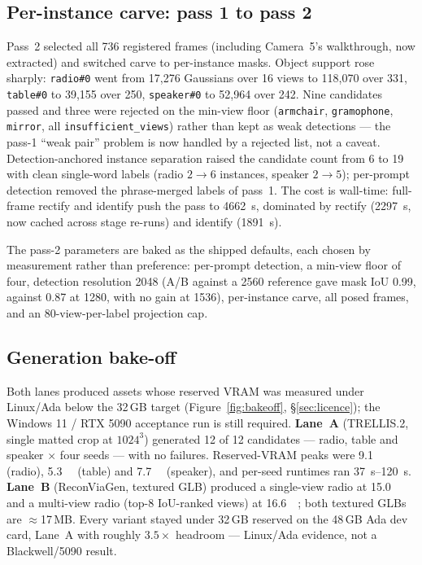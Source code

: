 \subsection{Per-instance carve: pass 1 to pass 2}
Pass~2 selected all 736 registered frames (including Camera~5's walkthrough, now extracted) and
switched carve to per-instance masks. Object support rose sharply: \texttt{radio\#0} went from
17{,}276 Gaussians over 16 views to 118{,}070 over 331, \texttt{table\#0} to 39{,}155 over 250,
\texttt{speaker\#0} to 52{,}964 over 242. Nine candidates passed and three were rejected on the
min-view floor (\texttt{armchair}, \texttt{gramophone}, \texttt{mirror}, all
\texttt{insufficient\_views}) rather than kept as weak detections --- the pass-1 ``weak pair''
problem is now handled by a rejected list, not a caveat. Detection-anchored instance separation
raised the candidate count from 6 to 19 with clean single-word labels (radio $2\to6$ instances,
speaker $2\to5$); per-prompt detection removed the phrase-merged labels of pass~1.
The cost is wall-time: full-frame rectify
and identify push the pass to \SI{4662}{\second}, dominated by rectify (\SI{2297}{\second}, now
cached across stage re-runs) and identify (\SI{1891}{\second}).

The pass-2 parameters are baked as the shipped defaults, each chosen by measurement rather than
preference: per-prompt detection, a min-view floor of four, detection resolution 2048 (A/B against
a 2560 reference gave mask IoU 0.99, against 0.87 at 1280, with no gain at 1536), per-instance
carve, all posed frames, and an 80-view-per-label projection cap.

\subsection{Generation bake-off}\label{sec:objgen}
Both lanes produced assets whose reserved VRAM was measured under Linux/Ada below the 32\,GB target
(Figure~\ref{fig:bakeoff}, \S\ref{sec:licence}); the Windows 11 / RTX 5090 acceptance run is still required.
\textbf{Lane~A} (TRELLIS.2, single matted crop at $1024^3$) generated 12 of 12 candidates ---
radio, table and speaker $\times$ four seeds --- with no failures. Reserved-VRAM peaks were
\SI{9.1}{\giga\byte} (radio), \SI{5.3}{\giga\byte} (table) and \SI{7.7}{\giga\byte} (speaker),
and per-seed runtimes ran \SIrange{37}{120}{\second}. \textbf{Lane~B} (ReconViaGen, textured GLB)
produced a single-view radio at \SI{15.0}{\giga\byte} and a multi-view radio (top-8 IoU-ranked
views) at \SI{16.6}{\giga\byte}; both textured GLBs are $\approx$17\,MB. Every variant stayed under 32\,GB reserved on the 48\,GB Ada
dev card, Lane~A with roughly $3.5\times$ headroom --- Linux/Ada evidence, not a Blackwell/5090 result.

